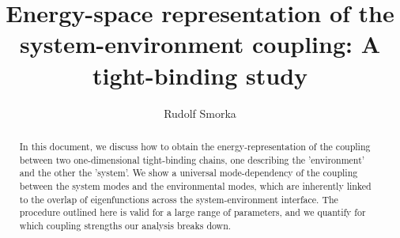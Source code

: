 \documentclass{article}
\begin{document}
\title{Energy-space representation of the system-environment coupling: A tight-binding study}
\author{Rudolf Smorka}
\maketitle
\begin{abstract}
	In this document, we discuss how to obtain the energy-representation of the coupling between two one-dimensional tight-binding chains, one describing the 'environment' and the other the 'system'. 
	We show a universal mode-dependency of the coupling between the system modes and the environmental modes, which are inherently linked to the overlap of eigenfunctions across the system-environment interface. The procedure outlined here is valid for a large range of parameters, and we quantify for which coupling strengths our analysis breaks down.
\end{abstract}
\end{document}
